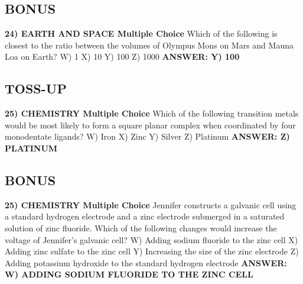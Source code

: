 \documentclass{article}
\begin{document}
\subsection*{BONUS}
\textbf{24) EARTH AND SPACE Multiple Choice} Which of the following is closest to the ratio between the volumes of Olympus Mons on Mars and Mauna Loa on Earth?
W) 1
X) 10
Y) 100
Z) 1000
\textbf{ANSWER: Y) 100}

\subsection*{TOSS-UP}
\textbf{25) CHEMISTRY Multiple Choice} Which of the following transition metals would be most likely to form a square planar complex when coordinated by four monodentate ligands?
W) Iron
X) Zinc
Y) Silver
Z) Platinum
\textbf{ANSWER: Z) PLATINUM}

\subsection*{BONUS}
\textbf{25) CHEMISTRY Multiple Choice} Jennifer constructs a galvanic cell using a standard hydrogen electrode and a zinc electrode submerged in a saturated solution of zinc fluoride. Which of the following changes would increase the voltage of Jennifer's galvanic cell?
W) Adding sodium fluoride to the zinc cell
X) Adding zinc sulfate to the zinc cell
Y) Increasing the size of the zinc electrode
Z) Adding potassium hydroxide to the standard hydrogen electrode
\textbf{ANSWER: W) ADDING SODIUM FLUORIDE TO THE ZINC CELL}
\end{document}

